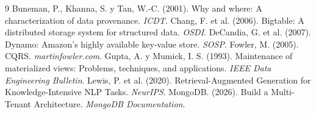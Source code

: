 \documentclass[11pt]{article}
\begin{document}
\begin{thebibliography}{9}
 Buneman, P., Khanna, S. y Tan, W.-C. (2001). Why and where: A characterization of data provenance. \emph{ICDT}.
 Chang, F. et al. (2006). Bigtable: A distributed storage system for structured data. \emph{OSDI}.
 DeCandia, G. et al. (2007). Dynamo: Amazon's highly available key-value store. \emph{SOSP}.
 Fowler, M. (2005). CQRS. \emph{martinfowler.com}.
 Gupta, A. y Mumick, I. S. (1993). Maintenance of materialized views: Problems, techniques, and applications. \emph{IEEE Data Engineering Bulletin}.
 Lewis, P. et al. (2020). Retrieval-Augmented Generation for Knowledge-Intensive NLP Tasks. \emph{NeurIPS}.
 MongoDB. (2026). Build a Multi-Tenant Architecture. \emph{MongoDB Documentation}.
\end{thebibliography}
\end{document}
